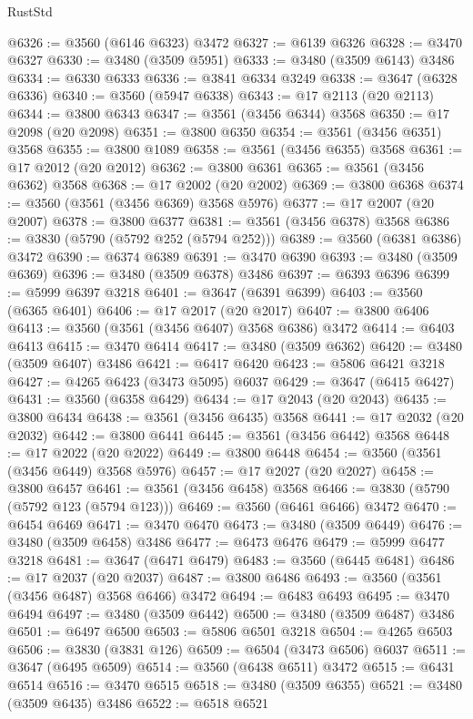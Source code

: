 \begin{lexlean}{RustStd}
\begin{coremodule}
@6326 := @3560 (@6146 @6323) @3472
@6327 := @6139 @6326
@6328 := @3470 @6327
@6330 := @3480 (@3509 @5951)
@6333 := @3480 (@3509 @6143) @3486
@6334 := @6330 @6333
@6336 := @3841 @6334 @3249
@6338 := @3647 (@6328 @6336)
@6340 := @3560 (@5947 @6338)
@6343 := @17 @2113 (@20 @2113)
@6344 := @3800 @6343
@6347 := @3561 (@3456 @6344) @3568
@6350 := @17 @2098 (@20 @2098)
@6351 := @3800 @6350
@6354 := @3561 (@3456 @6351) @3568
@6355 := @3800 @1089
@6358 := @3561 (@3456 @6355) @3568
@6361 := @17 @2012 (@20 @2012)
@6362 := @3800 @6361
@6365 := @3561 (@3456 @6362) @3568
@6368 := @17 @2002 (@20 @2002)
@6369 := @3800 @6368
@6374 := @3560 (@3561 (@3456 @6369) @3568 @5976)
@6377 := @17 @2007 (@20 @2007)
@6378 := @3800 @6377
@6381 := @3561 (@3456 @6378) @3568
@6386 := @3830 (@5790 (@5792 @252 (@5794 @252)))
@6389 := @3560 (@6381 @6386) @3472
@6390 := @6374 @6389
@6391 := @3470 @6390
@6393 := @3480 (@3509 @6369)
@6396 := @3480 (@3509 @6378) @3486
@6397 := @6393 @6396
@6399 := @5999 @6397 @3218
@6401 := @3647 (@6391 @6399)
@6403 := @3560 (@6365 @6401)
@6406 := @17 @2017 (@20 @2017)
@6407 := @3800 @6406
@6413 := @3560 (@3561 (@3456 @6407) @3568 @6386) @3472
@6414 := @6403 @6413
@6415 := @3470 @6414
@6417 := @3480 (@3509 @6362)
@6420 := @3480 (@3509 @6407) @3486
@6421 := @6417 @6420
@6423 := @5806 @6421 @3218
@6427 := @4265 @6423 (@3473 @5095) @6037
@6429 := @3647 (@6415 @6427)
@6431 := @3560 (@6358 @6429)
@6434 := @17 @2043 (@20 @2043)
@6435 := @3800 @6434
@6438 := @3561 (@3456 @6435) @3568
@6441 := @17 @2032 (@20 @2032)
@6442 := @3800 @6441
@6445 := @3561 (@3456 @6442) @3568
@6448 := @17 @2022 (@20 @2022)
@6449 := @3800 @6448
@6454 := @3560 (@3561 (@3456 @6449) @3568 @5976)
@6457 := @17 @2027 (@20 @2027)
@6458 := @3800 @6457
@6461 := @3561 (@3456 @6458) @3568
@6466 := @3830 (@5790 (@5792 @123 (@5794 @123)))
@6469 := @3560 (@6461 @6466) @3472
@6470 := @6454 @6469
@6471 := @3470 @6470
@6473 := @3480 (@3509 @6449)
@6476 := @3480 (@3509 @6458) @3486
@6477 := @6473 @6476
@6479 := @5999 @6477 @3218
@6481 := @3647 (@6471 @6479)
@6483 := @3560 (@6445 @6481)
@6486 := @17 @2037 (@20 @2037)
@6487 := @3800 @6486
@6493 := @3560 (@3561 (@3456 @6487) @3568 @6466) @3472
@6494 := @6483 @6493
@6495 := @3470 @6494
@6497 := @3480 (@3509 @6442)
@6500 := @3480 (@3509 @6487) @3486
@6501 := @6497 @6500
@6503 := @5806 @6501 @3218
@6504 := @4265 @6503
@6506 := @3830 (@3831 @126)
@6509 := @6504 (@3473 @6506) @6037
@6511 := @3647 (@6495 @6509)
@6514 := @3560 (@6438 @6511) @3472
@6515 := @6431 @6514
@6516 := @3470 @6515
@6518 := @3480 (@3509 @6355)
@6521 := @3480 (@3509 @6435) @3486
@6522 := @6518 @6521

\end{coremodule}
\end{lexlean}
